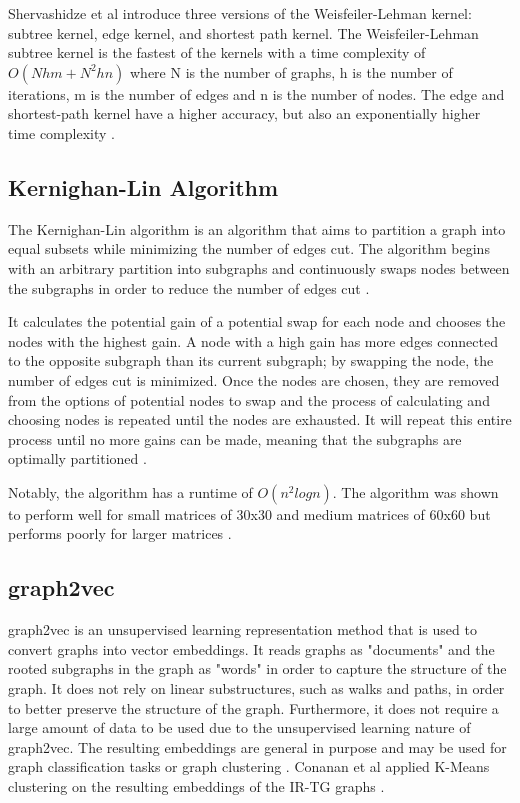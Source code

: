 Shervashidze et al introduce three versions of the Weisfeiler-Lehman kernel: subtree kernel, edge kernel, and shortest path kernel. The Weisfeiler-Lehman subtree kernel is the fastest of the kernels with a time complexity of $O(Nhm + N^2hn)$ where N is the number of graphs, h is the number of iterations, m is the number of edges and n is the number of nodes. The edge and shortest-path kernel have a higher accuracy, but also an exponentially higher time complexity \cite{weisfeiler-lehman}.

\subsection{Kernighan-Lin Algorithm}
The Kernighan-Lin algorithm is an algorithm that aims to partition a graph into equal subsets while minimizing the number of edges cut. The algorithm begins with an arbitrary partition into subgraphs and continuously swaps nodes between the subgraphs in order to reduce the number of edges cut \cite{kernighan-lin}.

It calculates the potential gain of a potential swap for each node and chooses the nodes with the highest gain. A node with a high gain has more edges connected to the opposite subgraph than its current subgraph; by swapping the node, the number of edges cut is minimized. Once the nodes are chosen, they are removed from the options of potential nodes to swap and the process of calculating and choosing nodes is repeated until the nodes are exhausted. It will repeat this entire process until no more gains can be made, meaning that the subgraphs are optimally partitioned \cite{kernighan-lin}.

Notably, the algorithm has a runtime of $O(n^2logn)$. The algorithm was shown to perform well for small matrices of 30x30 and medium matrices of 60x60 but performs poorly for larger matrices \cite{kernighan-lin}.

\subsection{graph2vec}
graph2vec is an unsupervised learning representation method that is used to convert graphs into vector embeddings. It reads graphs as "documents" and the rooted subgraphs in the graph as "words" in order to capture the structure of the graph. It does not rely on linear substructures, such as walks and paths, in order to better preserve the structure of the graph. Furthermore, it does not require a large amount of data to be used due to the unsupervised learning nature of graph2vec. The resulting embeddings are general in purpose and may be used for graph classification tasks or graph clustering \cite{graph2vec}. Conanan et al applied K-Means clustering on the resulting embeddings of the IR-TG graphs \cite{ConananEtAl}.

